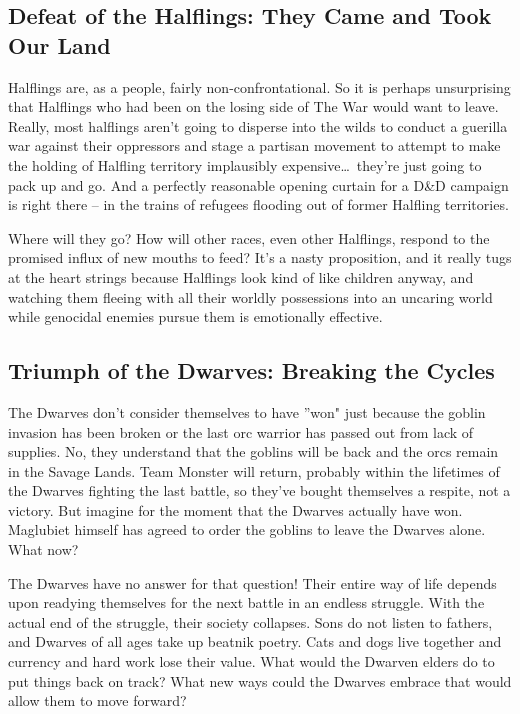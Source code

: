 \subsection{Defeat of the Halflings: They Came and Took Our Land}

Halflings are, as a people, fairly non-confrontational. So it is perhaps unsurprising that Halflings who had been on the losing side of The War would want to leave. Really, most halflings aren't going to disperse into the wilds to conduct a guerilla war against their oppressors and stage a partisan movement to attempt to make the holding of Halfling territory implausibly expensive\ldots\  they're just going to pack up and go. And a perfectly reasonable opening curtain for a D\&D campaign is right there -- in the trains of refugees flooding out of former Halfling territories.

Where will they go? How will other races, even other Halflings, respond to the promised influx of new mouths to feed? It's a nasty proposition, and it really tugs at the heart strings because Halflings look kind of like children anyway, and watching them fleeing with all their worldly possessions into an uncaring world while genocidal enemies pursue them is emotionally effective.

\subsection{Triumph of the Dwarves: Breaking the Cycles}

The Dwarves don't consider themselves to have ''won" just because the goblin invasion has been broken or the last orc warrior has passed out from lack of supplies. No, they understand that the goblins will be back and the orcs remain in the Savage Lands. Team Monster will return, probably within the lifetimes of the Dwarves fighting the last battle, so they've bought themselves a respite, not a victory. But imagine for the moment that the Dwarves actually have won. Maglubiet himself has agreed to order the goblins to leave the Dwarves alone. What now?

The Dwarves have no answer for that question! Their entire way of life depends upon readying themselves for the next battle in an endless struggle. With the actual end of the struggle, their society collapses. Sons do not listen to fathers, and Dwarves of all ages take up beatnik poetry. Cats and dogs live together and currency and hard work lose their value. What would the Dwarven elders do to put things back on track? What new ways could the Dwarves embrace that would allow them to move forward?

